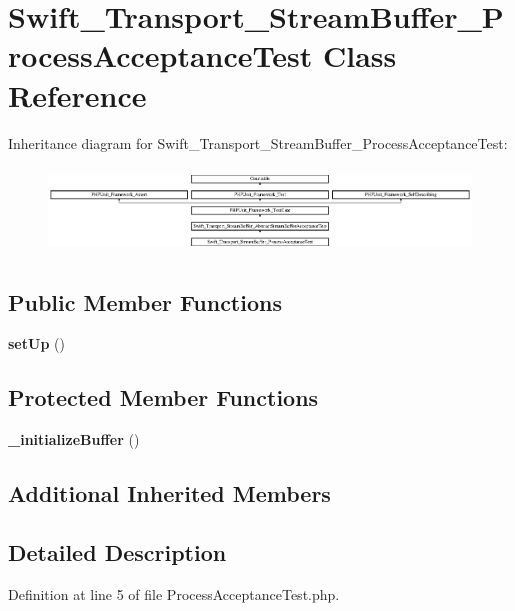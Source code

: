 \section{Swift\+\_\+\+Transport\+\_\+\+Stream\+Buffer\+\_\+\+Process\+Acceptance\+Test Class Reference}
\label{class_swift___transport___stream_buffer___process_acceptance_test}
Inheritance diagram for Swift\+\_\+\+Transport\+\_\+\+Stream\+Buffer\+\_\+\+Process\+Acceptance\+Test\+:\begin{figure}[H]
\begin{center}
\leavevmode
\includegraphics[height=2.287582cm]{class_swift___transport___stream_buffer___process_acceptance_test}
\end{center}
\end{figure}
\subsection*{Public Member Functions}
\begin{DoxyCompactItemize}
\item 
{\bf set\+Up} ()
\end{DoxyCompactItemize}
\subsection*{Protected Member Functions}
\begin{DoxyCompactItemize}
\item 
{\bf \+\_\+initialize\+Buffer} ()
\end{DoxyCompactItemize}
\subsection*{Additional Inherited Members}


\subsection{Detailed Description}


Definition at line 5 of file Process\+Acceptance\+Test.\+php.



